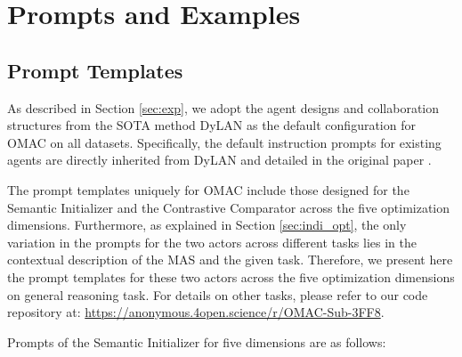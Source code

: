 


\section{Prompts and Examples}\label{sec:prompt}

\subsection{Prompt Templates}\label{sec:prompt_tem}

As described in Section \ref{sec:exp}, we adopt the agent designs and collaboration structures from the SOTA method DyLAN \cite{dylan} as the default configuration for OMAC on all datasets. Specifically, the default instruction prompts for existing agents are directly inherited from DyLAN and detailed in the original paper \cite{dylan}. 

The prompt templates uniquely for OMAC include those designed for the Semantic Initializer and the Contrastive Comparator across the five optimization dimensions.  Furthermore, as explained in Section \ref{sec:indi_opt}, the only variation in the prompts for the two actors across different tasks lies in the contextual description of the MAS and the given task. Therefore, we present here the prompt templates for these two actors across the five optimization dimensions on general reasoning task. For details on other tasks, please refer to our code repository at: \href{https://anonymous.4open.science/r/OMAC-Sub-3FF8}{https://anonymous.4open.science/r/OMAC-Sub-3FF8}.


Prompts of the Semantic Initializer for five dimensions are as follows:

\vspace{1mm}


